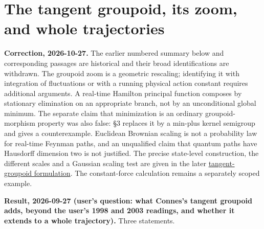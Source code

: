 \documentclass[11pt,a4paper]{article}
\begin{document}
\hypertarget{the-tangent-groupoid-its-zoom-and-whole-trajectories}{%
\section{The tangent groupoid, its zoom, and whole
trajectories}\label{the-tangent-groupoid-its-zoom-and-whole-trajectories}}

\textbf{Correction, 2026-10-27.} The earlier numbered summary below and
corresponding passages are historical and their broad identifications
are withdrawn. The groupoid zoom is a geometric rescaling; identifying
it with integration of fluctuations or with a running physical action
constant requires additional arguments. A real-time Hamilton principal
function composes by stationary elimination on an appropriate branch,
not by an unconditional global minimum. The separate claim that
minimization is an ordinary groupoid-morphism property was also false:
§3 replaces it by a min-plus kernel semigroup and gives a
counterexample. Euclidean Brownian scaling is not a probability law for
real-time Feynman paths, and an unqualified claim that quantum paths
have Hausdorff dimension two is not justified. The precise state-level
construction, the different scales and a Gaussian scaling test are given
in the later \href{groupoid-quantum-newton-states.md}{tangent-groupoid
formulation}. The constant-force calculation remains a separately scoped
example.

\textbf{Result, 2026-09-27 (user's question: what Connes's tangent
groupoid adds, beyond the user's 1998 and 2003 readings, and whether it
extends to a whole trajectory).} Three statements.
\end{document}
